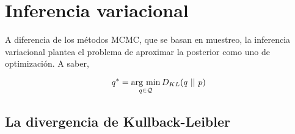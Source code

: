 \documentclass[main.tex]{subfiles}
\begin{document}
\chapter*{Inferencia variacional}
A diferencia de los métodos MCMC, que se basan en muestreo, la inferencia
variacional plantea el problema de aproximar la posterior como uno de
optimización. A saber,

\begin{equation}
q^* = \operatorname*{arg\,\min} _{q \in \mathcal{Q}} D_{KL}(q\ ||\ p)
	\label{eqn:vi}
\end{equation}

\section*{La divergencia de Kullback-Leibler}
\end{document}

